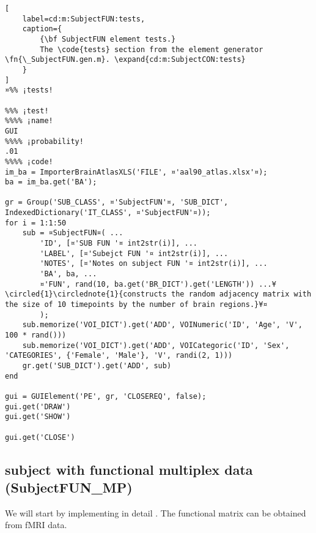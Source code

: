 \documentclass{tufte-handout}
\begin{document}
\clearpage
\begin{lstlisting}[
	label=cd:m:SubjectFUN:tests,
	caption={
		{\bf SubjectFUN element tests.}
		The \code{tests} section from the element generator \fn{\_SubjectFUN.gen.m}. \expand{cd:m:SubjectCON:tests}
	}
]
¤%% ¡tests!

%%% ¡test!
%%%% ¡name!
GUI
%%%% ¡probability!
.01
%%%% ¡code!
im_ba = ImporterBrainAtlasXLS('FILE', ¤'aal90_atlas.xlsx'¤);
ba = im_ba.get('BA');

gr = Group('SUB_CLASS', ¤'SubjectFUN'¤, 'SUB_DICT', IndexedDictionary('IT_CLASS', ¤'SubjectFUN'¤));
for i = 1:1:50
    sub = ¤SubjectFUN¤( ...
        'ID', [¤'SUB FUN '¤ int2str(i)], ...
        'LABEL', [¤'Subejct FUN '¤ int2str(i)], ...
        'NOTES', [¤'Notes on subject FUN '¤ int2str(i)], ...
        'BA', ba, ...
        ¤'FUN', rand(10, ba.get('BR_DICT').get('LENGTH')) ...¥\circled{1}\circlednote{1}{constructs the random adjacency matrix with the size of 10 timepoints by the number of brain regions.}¥¤
        );
    sub.memorize('VOI_DICT').get('ADD', VOINumeric('ID', 'Age', 'V', 100 * rand()))
    sub.memorize('VOI_DICT').get('ADD', VOICategoric('ID', 'Sex', 'CATEGORIES', {'Female', 'Male'}, 'V', randi(2, 1)))
    gr.get('SUB_DICT').get('ADD', sub)
end

gui = GUIElement('PE', gr, 'CLOSEREQ', false);
gui.get('DRAW')
gui.get('SHOW')

gui.get('CLOSE')
\end{lstlisting}

\clearpage
\subsection{subject with functional multiplex data (SubjectFUN\_MP)}

We will start by implementing in detail . The functional matrix can be obtained from fMRI data.
\end{document}
